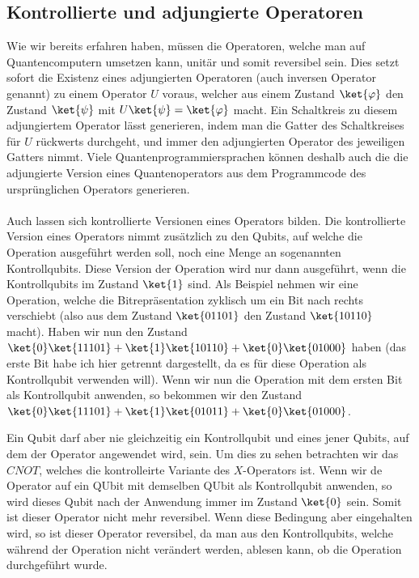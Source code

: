 \subsection{Kontrollierte und adjungierte Operatoren}
Wie wir bereits erfahren haben, müssen die Operatoren, welche man auf Quantencomputern umsetzen kann, unitär und somit reversibel sein. Dies setzt sofort die Existenz eines adjungierten Operatoren (auch inversen Operator genannt) zu einem Operator $U$ voraus, welcher aus einem Zustand $\ket{\varphi}$ den Zustand $\ket{\psi}$ mit $U\ket{\psi} = \ket{\varphi}$ macht. Ein Schaltkreis zu diesem adjungiertem Operator lässt generieren, indem man die Gatter des Schaltkreises für $U$ rückwerts durchgeht, und immer den adjungierten Operator des jeweiligen Gatters nimmt. Viele Quantenprogrammiersprachen können deshalb auch die die adjungierte Version eines Quantenoperators aus dem Programmcode des ursprünglichen Operators generieren.

\paragraph{}
Auch lassen sich kontrollierte Versionen eines Operators bilden. Die kontrollierte Version eines Operators nimmt zusätzlich zu den Qubits, auf welche die Operation ausgeführt werden soll, noch eine Menge an sogenannten Kontrollqubits. Diese Version der Operation wird nur dann ausgeführt, wenn die Kontrollqubits im Zustand $\ket{1}$ sind. Als Beispiel nehmen wir eine Operation, welche die Bitrepräsentation zyklisch um ein Bit nach rechts verschiebt (also aus dem Zustand $\ket{01101}$ den Zustand $\ket{10110}$ macht). Haben wir nun den Zustand $\ket{0}\ket{11101} + \ket{1}\ket{10110} + \ket{0}\ket{01000}$ haben (das erste Bit habe ich hier getrennt dargestellt, da es für diese Operation als Kontrollqubit verwenden will). Wenn wir nun die Operation mit dem ersten Bit als Kontrollqubit anwenden, so bekommen wir den Zustand $\ket{0}\ket{11101} + \ket{1}\ket{01011} + \ket{0}\ket{01000}$. 

Ein Qubit darf aber nie gleichzeitig ein Kontrollqubit und eines jener Qubits, auf dem der Operator angewendet wird, sein. Um dies zu sehen betrachten wir das $CNOT$, welches die kontrolleirte Variante des $X$-Operators ist. Wenn wir de Operator auf ein QUbit mit demselben QUbit als Kontrollqubit anwenden, so wird dieses Qubit nach der Anwendung immer im Zustand $\ket{0}$ sein. Somit ist dieser Operator nicht mehr reversibel. Wenn diese Bedingung aber eingehalten wird, so ist dieser Operator reversibel, da man aus den Kontrollqubits, welche während der Operation nicht verändert werden, ablesen kann, ob die Operation durchgeführt wurde.


